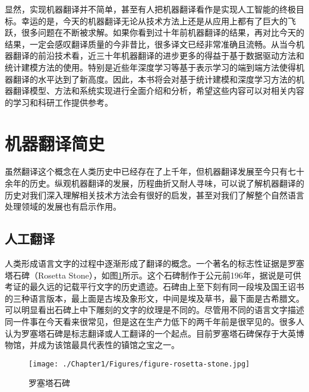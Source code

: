 \parinterval 显然，实现机器翻译并不简单，甚至有人把机器翻译看作是实现人工智能的终极目标。幸运的是，今天的机器翻译无论从技术方法上还是从应用上都有了巨大的飞跃，很多问题在不断被求解。如果你看到过十年前机器翻译的结果，再对比今天的结果，一定会感叹翻译质量的今非昔比，很多译文已经非常准确且流畅。从当今机器翻译的前沿技术看，近三十年机器翻译的进步更多的得益于基于数据驱动方法和统计建模方法的使用。特别是近些年深度学习等基于表示学习的端到端方法使得机器翻译的水平达到了新高度。因此，本书将会对基于统计建模和深度学习方法的机器翻译模型、方法和系统实现进行全面介绍和分析，希望这些内容可以对相关内容的学习和科研工作提供参考。


\sectionnewpage
\section{机器翻译简史}

\parinterval 虽然翻译这个概念在人类历史中已经存在了上千年，但机器翻译发展至今只有七十余年的历史。纵观机器翻译的发展，历程曲折又耐人寻味，可以说了解机器翻译的历史对我们深入理解相关技术方法会有很好的启发，甚至对我们了解整个自然语言处理领域的发展也有启示作用。


\subsection{人工翻译}

\parinterval 人类形成语言文字的过程中逐渐形成了翻译的概念。一个著名的标志性证据是罗塞塔石碑（Rosetta Stone），如图\ref{fig:1-3}所示。这个石碑制作于公元前196年，据说是可供考证的最久远的记载平行文字的历史遗迹。石碑由上至下刻有同一段埃及国王诏书的三种语言版本，最上面是古埃及象形文，中间是埃及草书，最下面是古希腊文。可以明显看出石碑上中下雕刻的文字的纹理是不同的。尽管用不同的语言文字描述同一件事在今天看来很常见，但是这在生产力低下的两千年前是很罕见的。很多人认为罗塞塔石碑是标志翻译或人工翻译的一个起点。目前罗塞塔石碑保存于大英博物馆，并成为该馆最具代表性的镇馆之宝之一。

\begin{figure}[htp]
    \centering
\texttt{[image: ./Chapter1/Figures/figure-rosetta-stone.jpg]}
    \caption{罗塞塔石碑}
    \label{fig:1-3}
\end{figure}

